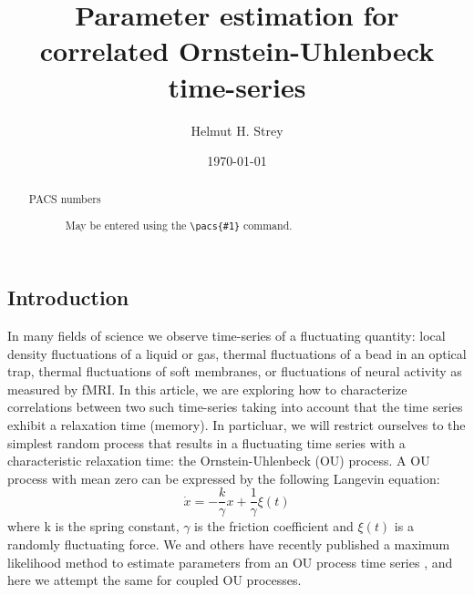 \documentclass[%
 reprint,
 amsmath,amssymb,
 aps,
]{revtex4-1}
\begin{document}

\title{Parameter estimation for correlated Ornstein-Uhlenbeck time-series}

\author{Helmut H. Strey}

\date{\today}%

\begin{abstract}
\begin{description}
\item[PACS numbers]
May be entered using the \verb+\pacs{#1}+ command.
\end{description}
\end{abstract}

\maketitle

\onecolumngrid
\subsection{Introduction}
In many fields of science we observe time-series of a fluctuating quantity: local density fluctuations of a liquid or gas, thermal fluctuations of a bead in an optical trap, thermal fluctuations of soft membranes, or fluctuations of neural activity as measured by fMRI.  In this article, we are exploring how to characterize correlations between two such time-series taking into account that the time series exhibit a relaxation time (memory).  In particluar, we will restrict ourselves to the simplest random process that results in a fluctuating time series with a characteristic relaxation time: the Ornstein-Uhlenbeck (OU) process.  A OU process with mean zero can be expressed by the following Langevin equation:
\begin{equation}
\dot x =  - \frac{k}{\gamma }x + \frac{1}{\gamma }\xi(t)
\label{model}
\end{equation}
where k is the spring constant, $\gamma$ is the friction coefficient and $\xi(t)$ is a randomly fluctuating force.  
We and others have recently published a maximum likelihood method to estimate parameters from an OU process time series \cite{RN91,RN51,RN62}, and here we attempt the same for coupled OU processes.
\end{document}
